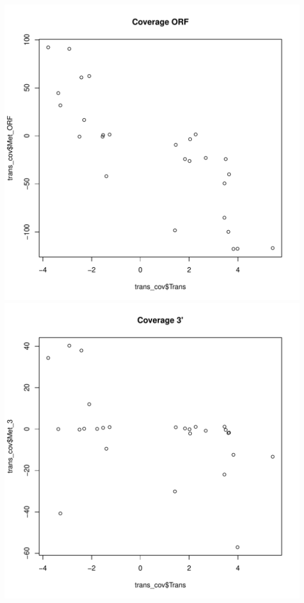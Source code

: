 \documentclass{article}\usepackage[]{graphicx}\usepackage[]{color}
\makeatletter
\def\maxwidth{ %
  \ifdim\Gin@nat@width>\linewidth
    \linewidth
  \else
    \Gin@nat@width
  \fi
}
\newenvironment{knitrout}{}{} %
\makeatother
\begin{document}
\begin{knitrout}
{\includegraphics[width=\maxwidth]{figure/minimal-correlacions_trans-5} 
\includegraphics[width=\maxwidth]{figure/minimal-correlacions_trans-6} 
}
\end{knitrout}
\end{document}
